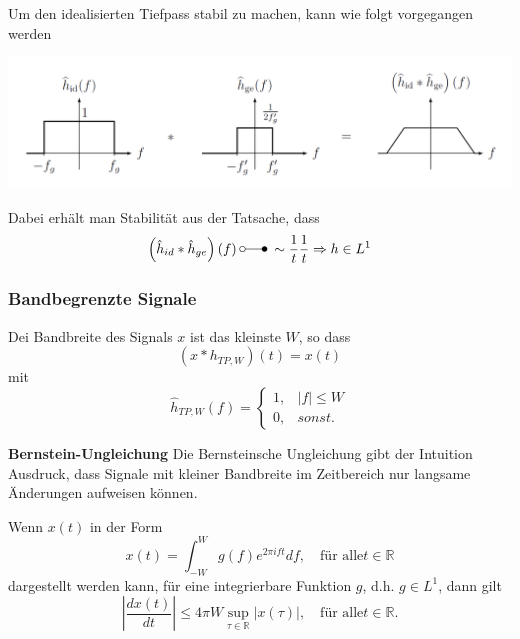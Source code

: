 Um den idealisierten Tiefpass stabil zu machen, kann wie folgt vorgegangen werden
\begin{center}
    \includegraphics*[width=\linewidth]{../img/7.3.1_TP_stab.png}
\end{center}
Dabei erhält man Stabilität aus der Tatsache, dass
\begin{equation*}
    \left(\hat{h}_{id}*\hat{h}_{ge}\right)(f) \: \laplace \: \sim \frac{1}{t}\frac{1}{t} \Rightarrow h\in L^1
\end{equation*}

\subsubsection{Bandbegrenzte Signale}
Dei Bandbreite des Signals $x$ ist das kleinste $W$, so dass
\begin{equation*}
    (x*h_{TP,W})(t)=x(t)
\end{equation*}
mit
\begin{equation*}
    \hat{h}_{TP,W}(f)=
    \begin{cases}
        1, & |f| \leq W \\
        0, & sonst.
    \end{cases}
\end{equation*}

\textbf{Bernstein-Ungleichung}
Die Bernsteinsche Ungleichung gibt der Intuition Ausdruck, dass Signale mit kleiner
Bandbreite im Zeitbereich nur langsame Änderungen aufweisen können.

Wenn $x(t)$ in der Form
\begin{equation*}
    x(t)=\int_{-W}^{W}g(f)e^{2\pi ift}df,\quad\text{für alle}t\in\mathbb{R}
\end{equation*}
dargestellt werden kann, für eine integrierbare Funktion $g$, d.h. $g \in L^1$, dann gilt
\begin{equation*}
    \left|\frac{dx(t)}{dt}\right|\leq4\pi W\sup_{\tau\in\mathbb{R}}|x(\tau)|,\quad\text{für alle}t\in\mathbb{R}.
\end{equation*}